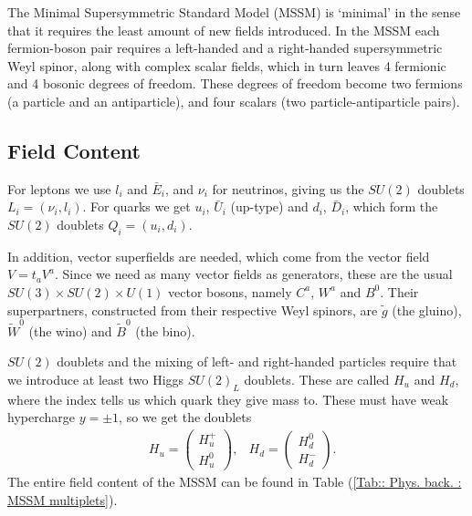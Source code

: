 \documentclass[twoside,english]{uiofysmaster}
\begin{document}
The Minimal Supersymmetric Standard Model (MSSM) is `minimal' in the sense that it requires the least amount of new fields introduced. In the MSSM each fermion-boson pair requires a left-handed and a right-handed supersymmetric Weyl spinor, along with complex scalar fields, which in turn leaves 4 fermionic and 4 bosonic degrees of freedom. These degrees of freedom become two fermions (a particle and an antiparticle), and four scalars (two particle-antiparticle pairs). 

\subsection{Field Content}

For leptons we use $l_i$ and $\bar{E}_i$, and $\nu_i$ for neutrinos, giving us the $SU(2)$ doublets $L_i = (\nu_i, l_i)$. For quarks we get $u_i$, $\bar{U}_i$ (up-type) and $d_i$, $\bar{D}_i$, which form the $SU(2)$ doublets $Q_i = (u_i, d_i)$.

In addition, vector superfields are needed, which come from the vector field $V = t_aV^a$. Since we need as many vector fields as generators, these are the usual $SU(3) \times SU(2) \times U(1)$ vector bosons, namely $C^a$, $W^a$ and $B^0$. Their superpartners, constructed from their respective Weyl spinors, are $\tilde{g}$ (the gluino), $\tilde{W}^0$ (the wino) and $\tilde{B}^0$ (the bino).

$SU(2)$ doublets and the mixing of left- and right-handed particles require that we introduce at least two Higgs $SU(2)_L$ doublets. These are called $H_u$ and $H_d$, where the index tells us which quark they give mass to. These must have weak hypercharge $y = \pm 1$, so we get the doublets
\begin{align}
&H_u = \begin{pmatrix}
H_u^+\\
H_u^0
\end{pmatrix},
&H_d = \begin{pmatrix}
H_d^0\\
H_d^-
\end{pmatrix}.
\end{align}  
The entire field content of the MSSM can be found in Table (\ref{Tab:: Phys. back. : MSSM multiplets}). %
\end{document}
